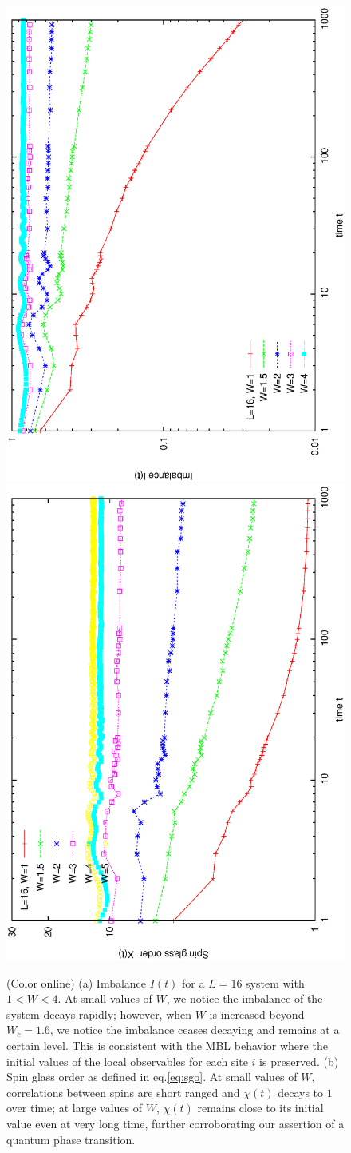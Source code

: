 \documentclass[prl,aps,epsf,showpacs,twocolumn,letterpaper]{revtex4}
\begin{document}
\begin{figure}[b]
  \includegraphics[angle=-90,width=3.in]{newfig2a.ps}\\
  \vspace{-0.0in}
  \includegraphics[angle=-90,width=3.in]{newfig2b.ps}\\
  \hspace{0.0in}
  \vspace{-0.in}
  \caption{(Color online) (a) Imbalance $I(t)$ for a $L=16$ system with $1 < W <
    4$.
    At small values of $W$, we notice the imbalance of the system decays
    rapidly; however, when $W$ is increased beyond $W_c = 1.6$, we notice the
    imbalance ceases decaying and remains at a certain level.
    This is consistent with the MBL behavior where the initial values of the
    local observables for each site $i$ is preserved.
    (b) Spin glass order as defined in eq.\ref{eq:sgo}.
    At small values of $W$, correlations between spins are short ranged and
    $\chi(t)$ decays to $1$ over time; at large values of
    $W$, $\chi(t)$ remains close to its initial value even at very long time,
    further corroborating our assertion of a quantum phase transition.
  }
\label{fig4}
\end{figure}
\end{document}
